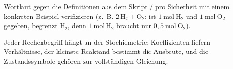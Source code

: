 \begin{kontrolle}
Wortlaut gegen die Definitionen aus dem Skript / pro Sicherheit mit einem
konkreten Beispiel verifizieren (z.~B. $2\,\mathrm{H_2}+\mathrm{O_2}$:
ist $1\ \mathrm{mol}\ \mathrm{H_2}$ und $1\ \mathrm{mol}\ \mathrm{O_2}$
gegeben, begrenzt $\mathrm{H_2}$, denn $1\ \mathrm{mol}\ \mathrm{H_2}$
braucht nur $0{,}5\ \mathrm{mol}\ \mathrm{O_2}$).
\end{kontrolle}

\begin{merksatz}
Jeder Rechenbegriff hängt an der Stochiometrie: Koeffizienten liefern
Verhältnisse, der kleinste Reaktand bestimmt die Ausbeute, und die
Zustandssymbole gehören zur vollständigen Gleichung.
\end{merksatz}
